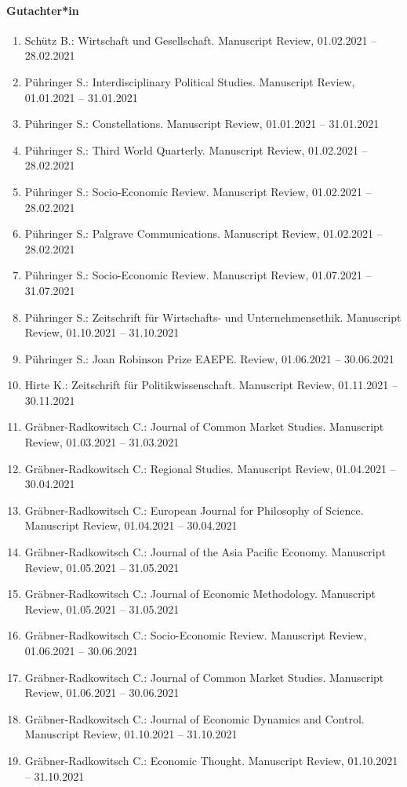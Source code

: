 \paragraph{Gutachter*in}
\begin{enumerate}[leftmargin=*, labelsep=0.5cm]
\item Schütz B.: Wirtschaft und Gesellschaft. Manuscript Review, 01.02.2021 -- 28.02.2021
\item Pühringer S.: Interdisciplinary Political Studies. Manuscript Review, 01.01.2021 -- 31.01.2021
\item Pühringer S.: Constellations. Manuscript Review, 01.01.2021 -- 31.01.2021
\item Pühringer S.: Third World Quarterly. Manuscript Review, 01.02.2021 -- 28.02.2021
\item Pühringer S.: Socio-Economic Review. Manuscript Review, 01.02.2021 -- 28.02.2021
\item Pühringer S.: Palgrave Communications. Manuscript Review, 01.02.2021 -- 28.02.2021
\item Pühringer S.: Socio-Economic Review. Manuscript Review, 01.07.2021 -- 31.07.2021
\item Pühringer S.: Zeitschrift für Wirtschafts- und Unternehmensethik. Manuscript Review, 01.10.2021 -- 31.10.2021
\item Pühringer S.: Joan Robinson Prize EAEPE. Review, 01.06.2021 -- 30.06.2021
\item Hirte K.: Zeitschrift für Politikwissenschaft. Manuscript Review, 01.11.2021 -- 30.11.2021
\item Gräbner-Radkowitsch C.: Journal of Common Market Studies. Manuscript Review, 01.03.2021 -- 31.03.2021
\item Gräbner-Radkowitsch C.: Regional Studies. Manuscript Review, 01.04.2021 -- 30.04.2021
\item Gräbner-Radkowitsch C.: European Journal for Philosophy of Science. Manuscript Review, 01.04.2021 -- 30.04.2021
\item Gräbner-Radkowitsch C.: Journal of the Asia Pacific Economy. Manuscript Review, 01.05.2021 -- 31.05.2021
\item Gräbner-Radkowitsch C.: Journal of Economic Methodology. Manuscript Review, 01.05.2021 -- 31.05.2021
\item Gräbner-Radkowitsch C.: Socio-Economic Review. Manuscript Review, 01.06.2021 -- 30.06.2021
\item Gräbner-Radkowitsch C.: Journal of Common Market Studies. Manuscript Review, 01.06.2021 -- 30.06.2021
\item Gräbner-Radkowitsch C.: Journal of Economic Dynamics and Control. Manuscript Review, 01.10.2021 -- 31.10.2021
\item Gräbner-Radkowitsch C.: Economic Thought. Manuscript Review, 01.10.2021 -- 31.10.2021
\end{enumerate}

